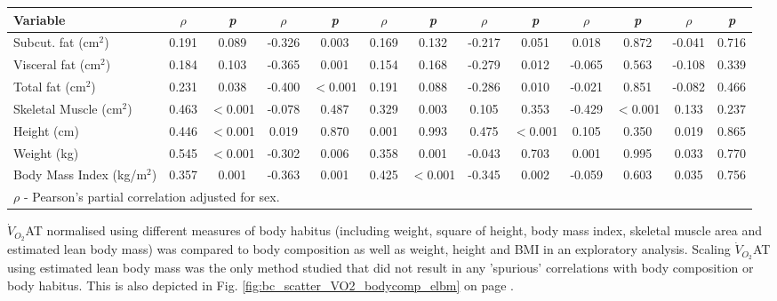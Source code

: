 \begin{sidewaystable}[p]
\begin{tabular}{|l|cc|cc|cc|cc|cc|cc|}
		Variable              	& $\rho$ &\textit{p}& $\rho$ &\textit{p}& $\rho$ &\textit{p}& $\rho$ &\textit{p}& $\rho$ &\textit{p}& $\rho$ &\textit{p} \\ \hline
		Subcut. fat (cm$^2$)     & 0.191  &  0.089   & -0.326 &  0.003   & 0.169  &  0.132   & -0.217 &  0.051   & 0.018  &  0.872   & -0.041 & 0.716 \\
		Visceral fat (cm$^2$)    & 0.184  &  0.103   & -0.365 &  0.001   & 0.154  &  0.168   & -0.279 &  0.012   & -0.065 &  0.563   & -0.108 & 0.339\\
		Total fat (cm$^2$)       & 0.231  &  0.038   & -0.400 & $<$0.001 & 0.191  &  0.088   & -0.286 &  0.010   & -0.021 &  0.851   & -0.082 & 0.466\\
		Skeletal Muscle (cm$^2$) & 0.463  & $<$0.001 & -0.078 &  0.487   & 0.329  &  0.003   & 0.105  &  0.353   & -0.429 & $<$0.001 & 0.133 & 0.237 \\
		Height (cm)               & 0.446  & $<$0.001 & 0.019  &  0.870   & 0.001  &  0.993   & 0.475  & $<$0.001 & 0.105  &  0.350   & 0.019 & 0.865\\
		Weight (kg)               & 0.545  & $<$0.001 & -0.302 &  0.006   & 0.358  &  0.001   & -0.043 &  0.703   & 0.001  &  0.995   & 0.033 & 0.770\\
		Body Mass Index (kg/m$^2$)      & 0.357  &  0.001   & -0.363 &  0.001   & 0.425  & $<$0.001 & -0.345 &  0.002   & -0.059 &  0.603   & 0.035 & 0.756\\ \hline
		\multicolumn{11}{l}{$\rho$ - Pearson's partial correlation adjusted for sex.}
	\end{tabular}
	\medskip
	\begin{flushleft}
		$\dot{V}_{O_2}$AT normalised using different measures of body habitus (including weight, square of height, body mass index, skeletal muscle area and estimated lean body mass) was compared to body composition as well as weight, height and BMI in an exploratory analysis. Scaling $\dot{V}_{O_2}$AT using estimated lean body mass was the only method studied that did not result in any 'spurious' correlations with body composition or body habitus. This is also depicted in Fig. \ref{fig:bc_scatter_VO2_bodycomp_elbm} on page \pageref{fig:bc_scatter_VO2_bodycomp_elbm}.
	\end{flushleft}
\end{sidewaystable}


